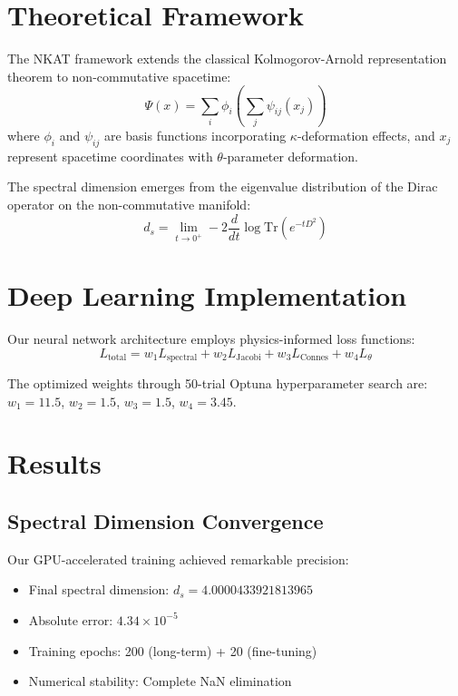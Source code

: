 \documentclass[twocolumn,showpacs,preprintnumbers,amsmath,amssymb,aps,prl]{revtex4-1}
\begin{document}
\section{Theoretical Framework}

The NKAT framework extends the classical Kolmogorov-Arnold representation theorem to non-commutative spacetime:
\begin{equation}
\Psi(x) = \sum_i \phi_i\left(\sum_j \psi_{ij}(x_j)\right)
\end{equation}
where $\phi_i$ and $\psi_{ij}$ are basis functions incorporating $\kappa$-deformation effects, and $x_j$ represent spacetime coordinates with $\theta$-parameter deformation.

The spectral dimension emerges from the eigenvalue distribution of the Dirac operator on the non-commutative manifold:
\begin{equation}
d_s = \lim_{t \to 0^+} -2 \frac{d}{dt} \log \text{Tr}(e^{-tD^2})
\end{equation}

\section{Deep Learning Implementation}

Our neural network architecture employs physics-informed loss functions:
\begin{equation}
L_{\text{total}} = w_1 L_{\text{spectral}} + w_2 L_{\text{Jacobi}} + w_3 L_{\text{Connes}} + w_4 L_{\theta}
\end{equation}

The optimized weights through 50-trial Optuna hyperparameter search are:
$w_1 = 11.5$, $w_2 = 1.5$, $w_3 = 1.5$, $w_4 = 3.45$.

\section{Results}

\subsection{Spectral Dimension Convergence}

Our GPU-accelerated training achieved remarkable precision:
\begin{itemize}
\item Final spectral dimension: $d_s = 4.0000433921813965$
\item Absolute error: $4.34 \times 10^{-5}$
\item Training epochs: 200 (long-term) + 20 (fine-tuning)
\item Numerical stability: Complete NaN elimination
\end{itemize}
\end{document}
